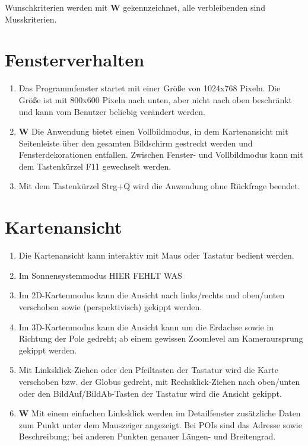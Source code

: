 \documentclass[10pt]{scrreprt}
\begin{document}
\renewcommand{\labelenumi}{\textbf{/F\numprint{\theenumi}0/}}

\newcommand{\W}{\textbf{W }}
Wunschkriterien werden mit \W  gekennzeichnet, alle verbleibenden sind Musskriterien.

\section{Fensterverhalten}
\begin{enumerate}[leftmargin=2cm]
\item Das Programmfenster startet mit einer Größe von 1024x768 Pixeln. Die Größe ist mit 800x600 Pixeln nach unten, aber nicht nach oben beschränkt und kann vom Benutzer beliebig  verändert werden.
\item \W Die Anwendung bietet einen Vollbildmodus, in dem Kartenansicht mit Seitenleiste über den gesamten Bildschirm gestreckt werden und Fensterdekorationen entfallen. Zwischen Fenster- und Vollbildmodus kann mit dem Tastenkürzel F11 gewechselt werden.
\item Mit dem Tastenkürzel Strg+Q wird die Anwendung ohne Rückfrage beendet.
\end{enumerate}
\section{Kartenansicht}
\begin{enumerate}[leftmargin=2cm,resume]
\item Die Kartenansicht kann interaktiv mit Maus oder Tastatur bedient werden.
\item Im Sonnensystemmodus HIER FEHLT WAS
\item Im 2D-Kartenmodus kann die Ansicht nach links/rechts und oben/unten verschoben sowie (perspektivisch) gekippt werden. 
\item Im 3D-Kartenmodus kann die Ansicht kann um die Erdachse sowie in Richtung der Pole gedreht; ab einem gewissen Zoomlevel am Kameraursprung gekippt werden.
\item Mit Linksklick-Ziehen oder den Pfeiltasten der Tastatur wird die Karte verschoben bzw. der Globus gedreht, mit Rechsklick-Ziehen nach oben/unten oder den BildAuf/BildAb-Tasten der Tastatur wird die Ansicht gekippt.
\item \W Mit einem einfachen Linksklick werden im Detailfenster zusätzliche Daten zum Punkt unter dem Mauszeiger angezeigt. Bei POIs sind das Adresse sowie Beschreibung; bei anderen Punkten genauer Längen- und Breitengrad.
\end{enumerate}
\end{document}
